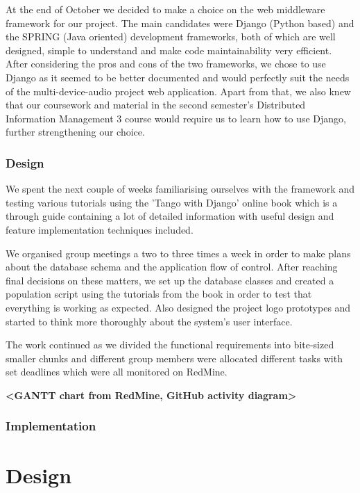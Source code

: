 \documentclass{l3proj}
\begin{document}
At the end of October we decided to make a choice on the web middleware framework for our project. The main candidates were Django (Python based) and the SPRING (Java oriented) development frameworks, both of which are well designed, simple to understand and make code maintainability very efficient. After considering the pros and cons of the two frameworks, we chose to use Django as it seemed to be better documented and would perfectly suit the needs of the multi-device-audio project web application. Apart from that, we also knew that our coursework and material in the second semester's Distributed Information Management 3 course would require us to learn how to use Django, further strengthening our choice.

\subsection{Design}

We spent the next couple of weeks familiarising ourselves with the framework and testing various tutorials using the 'Tango with Django' online book which is a through guide containing a lot of detailed information with useful design and feature implementation techniques included.

We organised group meetings a two to three times a week in order to make plans about the database schema and the application flow of control. After reaching final decisions on these matters, we set up the database classes and created a population script using the tutorials from the book in order to test that everything is working as expected. Also designed the project logo prototypes and started to think more thoroughly about the system's user interface.

The work continued as we divided the functional requirements into bite-sized smaller chunks and different group members were allocated different tasks with set deadlines which were all monitored on RedMine.

\textbf{<GANTT chart from RedMine, GitHub activity diagram>}

\subsection{Implementation}




\chapter{Design}
\label{design}
\end{document}

